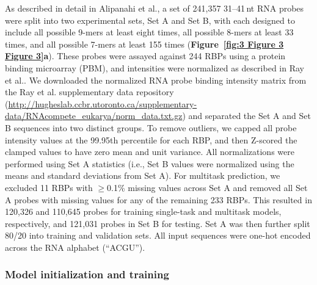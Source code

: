 As described in detail in Alipanahi et al.\cite{Alipanahi2015-ef}, a set of 241{,}357 31--41\,nt RNA probes were split into two experimental sets, Set A and Set B, with each designed to include all possible 9-mers at least eight times, all possible 8-mers at least 33 times, and all possible 7-mers at least 155 times (\textbf{Figure~\ref{fig:3 Figure 3 Figure 3}\textbf{a}}). These probes were assayed against 244 RBPs using a protein binding microarray (PBM)\cite{Berger2009-la}, and intensities were normalized as described in Ray et al.\cite{Ray2013-yd}. We downloaded the normalized RNA probe binding intensity matrix from the Ray et al. supplementary data repository (\url{http://hugheslab.ccbr.utoronto.ca/supplementary-data/RNAcompete_eukarya/norm_data.txt.gz}) and separated the Set A and Set B sequences into two distinct groups. To remove outliers, we capped all probe intensity values at the 99.95th percentile for each RBP, and then Z-scored the clamped values to have zero mean and unit variance. All normalizations were performed using Set A statistics (i.e., Set B values were normalized using the means and standard deviations from Set A). For multitask prediction, we excluded 11 RBPs with $\geq$0.1\% missing values across Set A and removed all Set A probes with missing values for any of the remaining 233 RBPs. This resulted in 120{,}326 and 110{,}645 probes for training single-task and multitask models, respectively, and 121{,}031 probes in Set B for testing. Set A was then further split 80/20 into training and validation sets. All input sequences were one-hot encoded across the RNA alphabet (“ACGU”).

\subsubsection{Model initialization and training}

